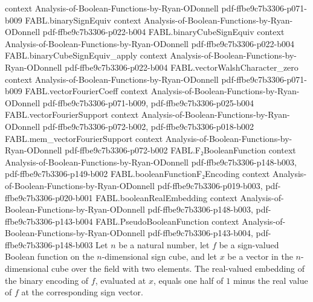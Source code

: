 \begin{theorem}
  {context}
  {Analysis-of-Boolean-Functions-by-Ryan-ODonnell}
  {pdf-ffbe9c7b3306-p071-b009}
\proofstep
  {FABL.binarySignEquiv}
  {context}
  {Analysis-of-Boolean-Functions-by-Ryan-ODonnell}
  {pdf-ffbe9c7b3306-p022-b004}
\proofstep
  {FABL.binaryCubeSignEquiv}
  {context}
  {Analysis-of-Boolean-Functions-by-Ryan-ODonnell}
  {pdf-ffbe9c7b3306-p022-b004}
\proofstep
  {FABL.binaryCubeSignEquiv_apply}
  {context}
  {Analysis-of-Boolean-Functions-by-Ryan-ODonnell}
  {pdf-ffbe9c7b3306-p022-b004}
\proofstep
  {FABL.vectorWalshCharacter_zero}
  {context}
  {Analysis-of-Boolean-Functions-by-Ryan-ODonnell}
  {pdf-ffbe9c7b3306-p071-b009}
\proofstep
  {FABL.vectorFourierCoeff}
  {context}
  {Analysis-of-Boolean-Functions-by-Ryan-ODonnell}
  {pdf-ffbe9c7b3306-p071-b009,
    pdf-ffbe9c7b3306-p025-b004}
\proofstep
  {FABL.vectorFourierSupport}
  {context}
  {Analysis-of-Boolean-Functions-by-Ryan-ODonnell}
  {pdf-ffbe9c7b3306-p072-b002,
    pdf-ffbe9c7b3306-p018-b002}
\proofstep
  {FABL.mem_vectorFourierSupport}
  {context}
  {Analysis-of-Boolean-Functions-by-Ryan-ODonnell}
  {pdf-ffbe9c7b3306-p072-b002}
\proofstep
  {FABL.F₂BooleanFunction}
  {context}
  {Analysis-of-Boolean-Functions-by-Ryan-ODonnell}
  {pdf-ffbe9c7b3306-p148-b003,
    pdf-ffbe9c7b3306-p149-b002}
\proofstep
  {FABL.booleanFunctionF₂Encoding}
  {context}
  {Analysis-of-Boolean-Functions-by-Ryan-ODonnell}
  {pdf-ffbe9c7b3306-p019-b003,
    pdf-ffbe9c7b3306-p020-b001}
\proofstep
  {FABL.booleanRealEmbedding}
  {context}
  {Analysis-of-Boolean-Functions-by-Ryan-ODonnell}
  {pdf-ffbe9c7b3306-p148-b003,
    pdf-ffbe9c7b3306-p143-b004}
\proofstep
  {FABL.PseudoBooleanFunction}
  {context}
  {Analysis-of-Boolean-Functions-by-Ryan-ODonnell}
  {pdf-ffbe9c7b3306-p143-b004,
    pdf-ffbe9c7b3306-p148-b003}
Let $n$ be a natural number, let $f$ be a sign-valued Boolean function on the
$n$-dimensional sign cube, and let $x$ be a vector in the $n$-dimensional cube over the
field with two elements. The real-valued embedding of the binary encoding of $f$,
evaluated at $x$, equals one half of $1$ minus the real value of $f$ at the
corresponding sign vector.
\end{theorem}

